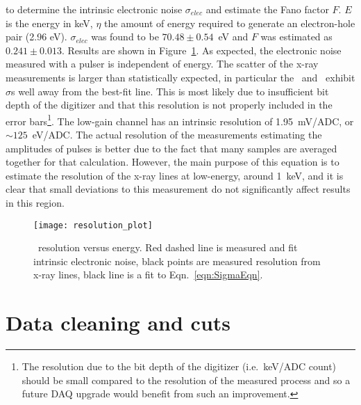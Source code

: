 to determine the intrinsic electronic noise $\sigma_{elec}$ and estimate the Fano factor $F$.  $E$ is the energy in keV, $\eta$ the amount of energy required to generate an electron-hole pair (2.96 eV).  $\sigma_{elec}$ was found to be $70.48\pm0.54$~eV and $F$ was estimated as $0.241\pm0.013$.  Results are shown in Figure~\ref{fig:BeGeResPlot}.  As expected, the electronic noise measured with a pulser is independent of energy.  The scatter of the x-ray measurements is larger than statistically expected, in particular the \znsixfive~and \galsixeight~exhibit $\sigma$s well away from the best-fit line.  This is most likely due to insufficient bit depth of the digitizer and that this resolution is not properly included in the error bars\footnote{The resolution due to the bit depth of the digitizer (i.e.~keV/ADC count) should be small compared to the resolution of the measured process and so a future DAQ upgrade would benefit from such an improvement.}.  The low-gain channel has an intrinsic resolution of 1.95~mV/ADC, or $\sim125$~eV/ADC.  The actual resolution of the measurements estimating the amplitudes of pulses is better due to the fact that many samples are averaged together for that calculation.  However, the main purpose of this equation is to estimate the resolution of the x-ray lines at low-energy, around 1~keV, and it is clear that small deviations to this measurement do not significantly affect results in this region.

			\begin{figure}
				\centering
				\texttt{[image: resolution\_plot]}
				\caption[\bege~resolution versus energy]
				{\bege~resolution versus energy.  Red dashed line is measured and fit intrinsic electronic noise, 
				black points are measured resolution from x-ray lines, black line is a fit to Eqn.~\ref{eqn:SigmaEqn}.}
				\label{fig:BeGeResPlot}
			\end{figure}





	\section{Data cleaning and cuts}
	\label{sec:BeGeCuts}	
	
